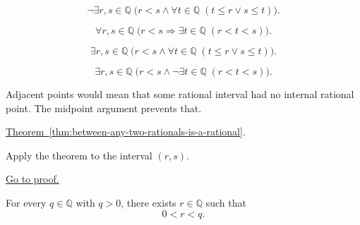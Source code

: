 \begin{remark*}
\[
\neg\exists r,s\in\mathbb{Q}\;
\bigl(r<s \land \forall t\in\mathbb{Q}\;(t\le r \lor s\le t)\bigr).
\]
\end{remark*}

\begin{remark*}
\[
\forall r,s\in\mathbb{Q}\;
\bigl(r<s \Longrightarrow \exists t\in\mathbb{Q}\;(r<t<s)\bigr).
\]
\end{remark*}

\begin{remark*}
\[
\exists r,s\in\mathbb{Q}\;
\bigl(r<s \land \forall t\in\mathbb{Q}\;(t\le r \lor s\le t)\bigr).
\]
\end{remark*}

\begin{remark*}
\[
\exists r,s\in\mathbb{Q}\;
\bigl(r<s \land \neg\exists t\in\mathbb{Q}\;(r<t<s)\bigr).
\]
\end{remark*}

\begin{remark*}
Adjacent points would mean that some rational interval had no internal rational
point. The midpoint argument prevents that.
\end{remark*}

\begin{remark*}[Dependencies]
\hyperref[thm:between-any-two-rationals-is-a-rational]{Theorem~\ref*{thm:between-any-two-rationals-is-a-rational}}.
\end{remark*}

\begin{remark*}
Apply the theorem to the interval $(r,s)$.
\end{remark*}

\begin{remark*}[Proof]
\hyperref[prf:q-has-no-adjacent-points]{Go to proof.}
\end{remark*}

\begin{tcolorbox}[colback=thmbox, colframe=thmborder, arc=2pt,
  left=6pt, right=6pt, top=4pt, bottom=4pt,
  title={\small\textbf{Theorem ($\mathbb{Q}$ Has No Minimum Positive Element)}},
  fonttitle=\small\bfseries]
\begin{theorem}
\label{thm:q-has-no-minimum-positive-element}
For every $q\in\mathbb{Q}$ with $q>0$, there exists $r\in\mathbb{Q}$ such that
\[
0<r<q.
\]
\end{theorem}
\end{tcolorbox}

